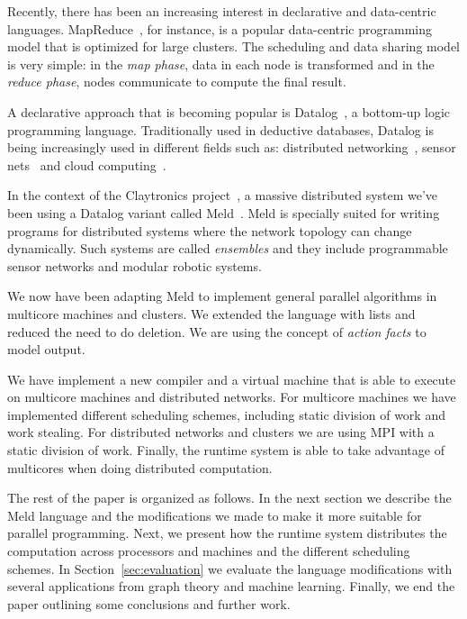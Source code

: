 \documentclass[preprint]{sigplanconf}
\begin{document}
Recently, there has been an increasing interest in declarative and data-centric languages.
MapReduce~\cite{Dean:2008:MSD:1327452.1327492}, for instance, is a popular data-centric programming
model that is optimized for large clusters. The scheduling and data sharing model is very simple:
in the \emph{map phase}, data in each node is transformed and in the \emph{reduce phase}, nodes
communicate to compute the final result.

A declarative approach that is becoming popular is Datalog~\cite{Ullman:1990:PDK:533142}, a
bottom-up logic programming language.
Traditionally used in deductive databases, Datalog is being increasingly used in different fields
such as: distributed networking~\cite{Loo-condie-garofalakis-p2}, sensor nets~\cite{Chu:2007:DID:1322263.1322281} and cloud computing~\cite{alvaro:boom}.

In the context of the Claytronics project~\cite{goldstein-computer05}, a massive distributed system
we've been using a Datalog variant called Meld~\cite{ashley-rollman-iclp09, ashley-rollman-derosa-iros07wksp}.
Meld is specially suited for writing programs for distributed systems where the network
topology can change dynamically. Such systems are called \emph{ensembles} and they include
programmable sensor networks and modular robotic systems.

We now have been adapting Meld to implement general parallel algorithms in multicore machines
and clusters. We extended the language with lists and reduced the need to do deletion.
We are using the concept of \emph{action facts} to model output.

We have implement a new compiler and a virtual machine that is able to execute on multicore machines
and distributed networks. For multicore machines we have implemented different scheduling schemes,
including static division of work and work stealing.
For distributed networks and clusters we are using MPI with a static division of work.
Finally, the runtime system is able to take advantage of multicores when doing distributed computation.

The rest of the paper is organized as follows. In the next section we describe the Meld language
and the modifications we made to make it more suitable for parallel programming. Next, we present
how the runtime system distributes the computation across processors and machines and the different
scheduling schemes. In Section~\ref{sec:evaluation} we evaluate the language modifications with
several applications from graph theory and machine learning. Finally, we end the paper outlining
some conclusions and further work.
\end{document}
